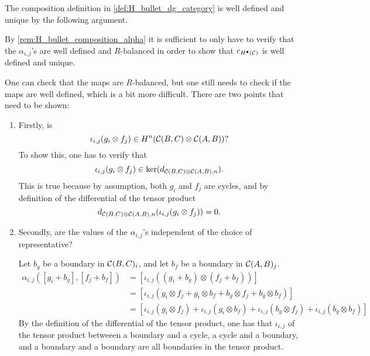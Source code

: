 \begin{remark}
    \label{rem:composition_in_H_bullet_is_well_defined}
    The composition definition in \autoref{def:H_bullet_dg_category} is well defined and unique by the following argument.

    By \autoref{rem:H_bullet_composition_alpha} it is sufficient to only have to verify that the \( \alpha_{i, j} \)'s are well defined and \( R \)-balanced in order to show that \( c_{H^\bullet({\mathcal{C}})} \) is well defined and unique.

    One can check that the maps are \( R \)-balanced, but one still needs to check if the maps are well defined, which is a bit more difficult. There are two points that need to be shown:
    \begin{enumerate}
        \item {
            Firstly, is
            \[
                \iota_{i, j}(g_i \otimes f_j) \in H^n({\mathcal{C}}(B, C) \otimes {\mathcal{C}}(A, B))?
            \]
            To show this, one has to verify that
            \[
                \iota_{i, j}(g_i \otimes f_j) \in \ker(d_{{\mathcal{C}}(B, C) \otimes {\mathcal{C}}(A, B), n}).
            \]
            This is true because by assumption, both \( g_i \) and \( f_j \) are cycles, and by definition of the differential of the tensor product
            \[
                d_{{\mathcal{C}}(B, C) \otimes {\mathcal{C}}(A, B), n}(\iota_{i, j}(g_i \otimes f_j)) = 0.
            \]
        }
        \item {
            Secondly, are the values of the \( \alpha_{i, j} \)'s independent of the choice of representative?

            Let \( b_g \) be a boundary in \( {\mathcal{C}}(B, C)_i \), and let \( b_f \) be a boundary in \( {\mathcal{C}}(A, B)_j \).
            \begin{align*}
                \alpha_{i, j}([g_i + b_g], [f_j + b_f]) &= [\iota_{i, j}((g_i + b_g) \otimes (f_j + b_f))] \\
                &= [\iota_{i, j}(g_i \otimes f_j + g_i \otimes b_f + b_g \otimes f_j + b_g \otimes b_f)] \\
                &= [\iota_{i, j}(g_i \otimes f_j) + \iota_{i, j}(g_i \otimes b_f) + \iota_{i, j}(b_g \otimes f_j) + \iota_ {i, j}(b_g \otimes b_f)]
            \end{align*}
            By the definition of the differential of the tensor product, one has that \( \iota_{i, j} \) of the tensor product betweeen a boundary and a cycle, a cycle and a boundary, and a boundary and a boundary are all boundaries in the tensor product.

}
\end{enumerate}
\end{remark}
